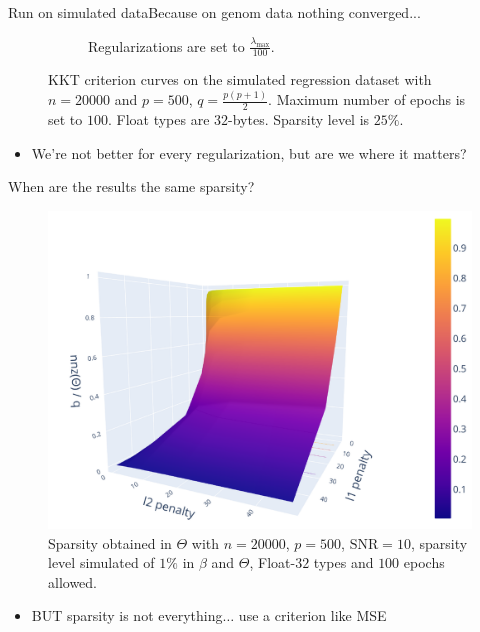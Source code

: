\documentclass[10pt,aspectratio=43]{beamer}
\begin{document}
\begin{frame}{Run on simulated data}{Because on genom data nothing converged...}
\begin{figure}[ht!]
\begin{subfigure}{.4\paperwidth}
            \caption{Regularizations are set to $\frac{\lambda_{\max}}{100}$.}
            \label{fig:simu_ccl_over100}
        \end{subfigure}
        \caption{KKT criterion curves on the simulated regression dataset with $n=20000$ and $p=500$, $q=\frac{p(p+1)}{2}$.
        Maximum number of epochs is set to $100$. Float types are $32$-bytes. Sparsity level is $25\%$.
        }
    \end{figure}
    \begin{itemize}
        \item We're not better for every regularization, but are we where it matters?
    \end{itemize}
\end{frame}

\begin{frame}{When are the results the same sparsity?}
    \begin{figure}[ht]
        \centering
        \includegraphics[scale=.3]{prebuilt_images/theta_surface_sparsity.pdf}
        \caption{Sparsity obtained in $\Theta$ with $n=20000$, $p=500$, $\mathrm{SNR}=10$, sparsity level simulated of $1\%$ in $\beta$ and $\Theta$, Float-$32$ types and $100$ epochs allowed.}
        \label{fig:sp_surf}
    \end{figure}

    \begin{itemize}
        \item BUT sparsity is not everything$\dots$ use a criterion like MSE
    \end{itemize}
\end{frame}
\end{document}
